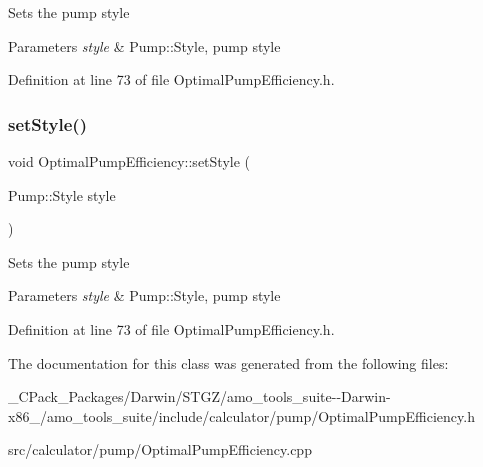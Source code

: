 Sets the pump style 
\begin{DoxyParams}{Parameters}
{\em style} & Pump\+::\+Style, pump style \\
\hline
\end{DoxyParams}


Definition at line 73 of file Optimal\+Pump\+Efficiency.\+h.

\mbox{\label{class_optimal_pump_efficiency_ab6b85c8c08d6641c5375c65436f16a2f}} 
\subsubsection{\texorpdfstring{set\+Style()}{setStyle()}\hspace{0.1cm}{\footnotesize\ttfamily [3/3]}}
{\footnotesize\ttfamily void Optimal\+Pump\+Efficiency\+::set\+Style (\begin{DoxyParamCaption}\item[{Pump\+::\+Style}]{style }\end{DoxyParamCaption})\hspace{0.3cm}{\ttfamily [inline]}}

Sets the pump style 
\begin{DoxyParams}{Parameters}
{\em style} & Pump\+::\+Style, pump style \\
\hline
\end{DoxyParams}


Definition at line 73 of file Optimal\+Pump\+Efficiency.\+h.



The documentation for this class was generated from the following files\+:\begin{DoxyCompactItemize}
\item 
\+\_\+\+C\+Pack\+\_\+\+Packages/\+Darwin/\+S\+T\+G\+Z/amo\+\_\+tools\+\_\+suite-\/-\/\+Darwin-\/x86\+\_/amo\+\_\+tools\+\_\+suite/include/calculator/pump/Optimal\+Pump\+Efficiency.\+h\item 
src/calculator/pump/Optimal\+Pump\+Efficiency.\+cpp\end{DoxyCompactItemize}

